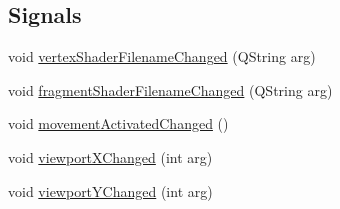 \subsection*{Signals}
\begin{DoxyCompactItemize}
\item 
void \mbox{\hyperlink{class_g_l_item_a2fea9c2dace4fa8f74b26a4d8c7d34c1}{vertex\+Shader\+Filename\+Changed}} (Q\+String arg)
\item 
void \mbox{\hyperlink{class_g_l_item_a9ee193afb733b9dc81f3c1e0eed39880}{fragment\+Shader\+Filename\+Changed}} (Q\+String arg)
\item 
void \mbox{\hyperlink{class_g_l_item_a2090aebc920ce93976316b9d43a44839}{movement\+Activated\+Changed}} ()
\item 
void \mbox{\hyperlink{class_g_l_item_aa79438b1da8394ef68e912afdb78670c}{viewport\+X\+Changed}} (int arg)
\item 
void \mbox{\hyperlink{class_g_l_item_ae652508d060e776d88285ca8a610d2fb}{viewport\+Y\+Changed}} (int arg)
\end{DoxyCompactItemize}
